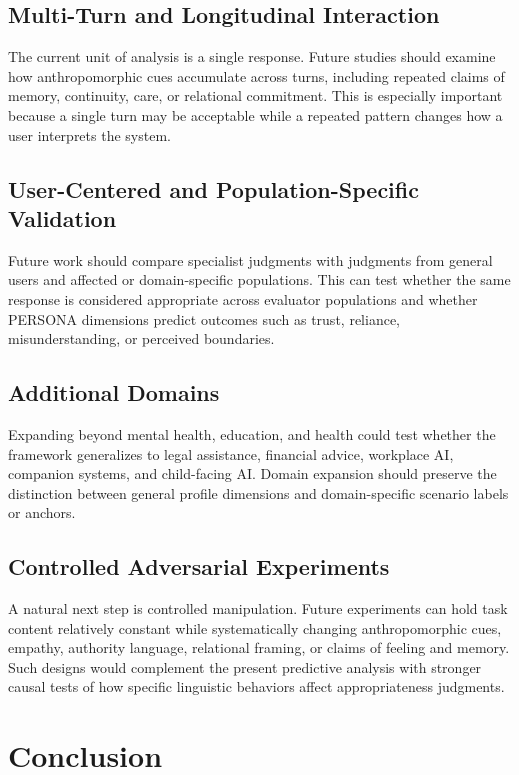 \documentclass[manuscript,review,anonymous]{acmart}
\begin{document}
\subsection{Multi-Turn and Longitudinal Interaction}

The current unit of analysis is a single response. Future studies should examine how anthropomorphic cues accumulate across turns, including repeated claims of memory, continuity, care, or relational commitment. This is especially important because a single turn may be acceptable while a repeated pattern changes how a user interprets the system.

\subsection{User-Centered and Population-Specific Validation}

Future work should compare specialist judgments with judgments from general users and affected or domain-specific populations. This can test whether the same response is considered appropriate across evaluator populations and whether PERSONA dimensions predict outcomes such as trust, reliance, misunderstanding, or perceived boundaries.

\subsection{Additional Domains}

Expanding beyond mental health, education, and health could test whether the framework generalizes to legal assistance, financial advice, workplace AI, companion systems, and child-facing AI. Domain expansion should preserve the distinction between general profile dimensions and domain-specific scenario labels or anchors.

\subsection{Controlled Adversarial Experiments}

A natural next step is controlled manipulation. Future experiments can hold task content relatively constant while systematically changing anthropomorphic cues, empathy, authority language, relational framing, or claims of feeling and memory. Such designs would complement the present predictive analysis with stronger causal tests of how specific linguistic behaviors affect appropriateness judgments.

\section{Conclusion}
\end{document}
